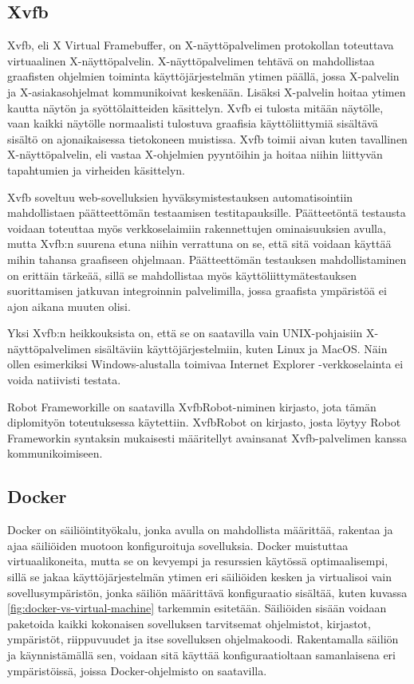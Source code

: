   \subsection{Xvfb} \label{ch:08_xvfb}

    Xvfb, eli X Virtual Framebuffer, on X-näyt\-tö\-pal\-ve\-li\-men  protokollan toteuttava virtuaalinen X-näyt\-tö\-pal\-ve\-lin.
    X-näyt\-tö\-pal\-ve\-li\-men tehtävä on mahdollistaa graafisten ohjelmien toiminta käyttöjärjestelmän ytimen päällä, jossa X-palvelin ja X-asiakasohjelmat kommunikoivat keskenään. Lisäksi X-palvelin hoitaa ytimen kautta näytön ja syöttölaitteiden käsittelyn.
    Xvfb ei tulosta mitään näytölle, vaan kaikki näytölle normaalisti tulostuva graafisia käyttöliittymiä sisältävä sisältö on ajonaikaisessa tietokoneen muistissa.
    Xvfb toimii aivan kuten tavallinen X-näyt\-tö\-pal\-ve\-lin, eli vastaa X-ohjelmien pyyntöihin ja hoitaa niihin liittyvän tapahtumien ja virheiden käsittelyn.

    Xvfb soveltuu web-sovelluksien hyväksymistestauksen automatisointiin mahdollistaen päätteettömän testaamisen testitapauksille.
    Päätteetöntä testausta voidaan toteuttaa myös verkkoselaimiin rakennettujen ominaisuuksien avulla, mutta Xvfb:n suurena etuna niihin verrattuna on se, että sitä voidaan käyttää mihin tahansa graafiseen ohjelmaan.
    Päätteettömän testauksen mahdollistaminen on erittäin tärkeää, sillä se mahdollistaa myös käyttöliittymätestauksen suorittamisen jatkuvan integroinnin palvelimilla, jossa graafista ympäristöä ei ajon aikana muuten olisi.

    Yksi Xvfb:n heikkouksista on, että se on saatavilla vain UNIX-pohjaisiin X-näyt\-tö\-pal\-ve\-li\-men sisältäviin käyttöjärjestelmiin, kuten Linux ja MacOS.
    Näin ollen esimerkiksi Windows-alustalla toimivaa Internet Explorer -verkkoselainta ei voida natiivisti testata.

    Robot Frameworkille on saatavilla XvfbRobot-niminen kirjasto, jota tämän diplomityön toteutuksessa käytettiin.
    XvfbRobot on kirjasto, josta löytyy Robot Frameworkin syntaksin mukaisesti määritellyt avainsanat Xvfb-palvelimen kanssa kommunikoimiseen.

  \subsection{Docker} \label{ch:08_docker}

    Docker on säiliöintityökalu, jonka avulla on mahdollista määrittää, rakentaa ja ajaa säiliöiden muotoon konfiguroituja sovelluksia.
    Docker muistuttaa virtuaalikoneita, mutta se on kevyempi ja resurssien käytössä optimaalisempi, sillä se jakaa käyttöjärjestelmän ytimen eri säiliöiden kesken ja virtualisoi vain sovellusympäristön, jonka säiliön määrittävä konfiguraatio sisältää, kuten kuvassa \ref{fig:docker-vs-virtual-machine} tarkemmin esitetään.
    Säiliöiden sisään voidaan paketoida kaikki kokonaisen sovelluksen tarvitsemat ohjelmistot, kirjastot, ympäristöt, riippuvuudet ja itse sovelluksen ohjelmakoodi.
    Rakentamalla säiliön ja käynnistämällä sen, voidaan sitä käyttää konfiguraatioltaan samanlaisena eri ympäristöissä, joissa Docker-ohjelmisto on saatavilla.

